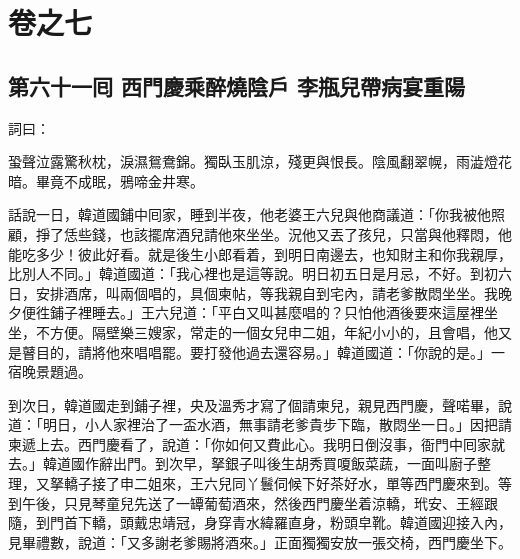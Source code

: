 \part*{{\titlename}卷之七}



\chapter*{第六十一囘 西門慶乘醉燒陰戶 李瓶兒帶病宴重陽}


詞曰：

\begin{myquote}
蛩聲泣露驚秋枕，淚濕鴛鴦錦。獨臥玉肌涼，殘更與恨長。陰風翻翠幌，雨澁燈花暗。畢竟不成眠，鴉啼金井寒。

\end{myquote}

話說一日，韓道國鋪中囘家，睡到半夜，他老婆王六兒與他商議道：「你我被他照顧，{}掙了恁些錢，也該擺席酒兒請他來坐坐。況他又丟了孩兒，只當與他釋悶，他能吃多少！彼此好看。就是後生小郎看着，{}到明日南邊去，也知財主和你我親厚，比別人不同。」韓道國道：「我心裡也是這等說。明日初五日是月忌，不好。到初六日，安排酒席，叫兩個唱的，具個柬帖，等我親自到宅內，請老爹散悶坐坐。我晚夕便徃鋪子裡睡去。」{}王六兒道：「平白又叫甚麼唱的？只怕他酒後要來這屋裡坐坐，不方便。隔壁樂三嫂家，常走的一個女兒申二姐，年紀小小的，且會唱，他又是瞽目的，請將他來唱唱罷。要打發他過去還容易。」韓道國道：「你說的是。」{}一宿晚景題過。

到次日，韓道國走到鋪子裡，央及溫秀才寫了個請柬兒，親見西門慶，聲喏畢，說道：「明日，小人家裡治了一盃水酒，無事請老爹貴步下臨，散悶坐一日。」因把請柬遞上去。西門慶看了，說道：「你如何又費此心。我明日倒沒事，衙門中囘家就去。」韓道國作辭出門。到次早，拏銀子叫後生胡秀買嗄飯菜蔬，一面叫廚子整理，又拏轎子接了申二姐來，王六兒同丫鬟伺候下好茶好水，單等西門慶來到。等到午後，只見琴童兒先送了一罈葡萄酒來，{}然後西門慶坐着涼轎，玳安、王經跟隨，到門首下轎，頭戴忠靖冠，身穿青水緯羅直身，粉頭皁靴。韓道國迎接入內，見畢禮數，說道：「又多謝老爹賜將酒來。」正面獨獨安放一張交椅，西門慶坐下。

